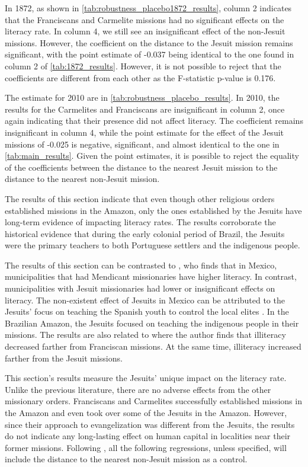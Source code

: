 \documentclass{article}
\begin{document}
In 1872, as shown in \autoref{tab:robustness_placebo1872_results}, column 2 indicates that the Franciscans and Carmelite missions had no significant effects on the literacy rate. In column 4, we still see an insignificant effect of the non-Jesuit missions. However, the coefficient on the distance to the Jesuit mission remains significant, with the point estimate of -0.037 being identical to the one found in column 2 of \autoref{tab:1872_results}. However, it is not possible to reject that the coefficients are different from each other as the F-statistic p-value is 0.176. 

The estimate for 2010 are in \autoref{tab:robustness_placebo_results}. 
In 2010, the results for the Carmelites and Franciscans are insignificant in column 2, once again indicating that their presence did not affect literacy. 
The coefficient remains insignificant in column 4, while the point estimate for the effect of the Jesuit missions of -0.025 is negative, significant, and almost identical to the one in \autoref{tab:main_results}. 
Given the point estimates, it is possible to reject the equality of the coefficients between the distance to the nearest Jesuit mission to the distance to the nearest non-Jesuit mission.

The results of this section indicate that even though other religious orders established missions in the Amazon, only the ones established by the Jesuits have long-term evidence of impacting literacy rates. The results corroborate the historical evidence that during the early colonial period of Brazil, the Jesuits were the primary teachers to both Portuguese settlers and the indigenous people.

The results of this section can be contrasted to \textcite{Waldinger2017-rz}, who finds that in Mexico, municipalities that had Mendicant missionaries have higher literacy. 
In contrast, municipalities with Jesuit missionaries had lower or insignificant effects on literacy. 
The non-existent effect of Jesuits in Mexico can be attributed to the Jesuits' focus on teaching the Spanish youth to control the local elites \parencite{Waldinger2017-rz}. 
In the Brazilian Amazon, the Jesuits focused on teaching the indigenous people in their missions. 
The results are also related to \textcite{Valencia_Caicedo2018-gp} where the author finds that illiteracy decreased farther from Franciscan missions. At the same time, illiteracy increased farther from the Jesuit missions. 

This section's results measure the Jesuits' unique impact on the literacy rate. 
Unlike the previous literature, there are no adverse effects from the other missionary orders. 
Franciscans and Carmelites successfully established missions in the Amazon and even took over some of the Jesuits in the Amazon. 
However, since their approach to evangelization was different from the Jesuits, the results do not indicate any long-lasting effect on human capital in localities near their former missions.
Following \textcite{Valencia_Caicedo2018-gp}, all the following regressions, unless specified, will include the distance to the nearest non-Jesuit mission as a control. 
\end{document}
